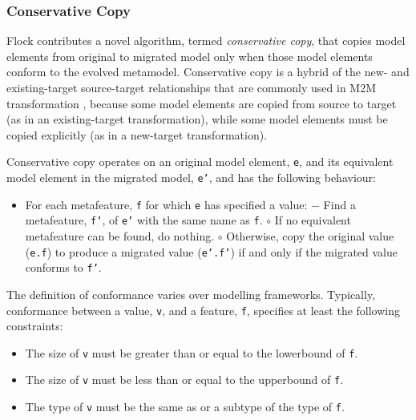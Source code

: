 \subsubsection{Conservative Copy}
\label{subsubsec:conservative_copying}
Flock contributes a novel algorithm, termed \emph{conservative copy}, that copies model elements from original to migrated model only when those model elements conform to the evolved metamodel. Conservative copy is a hybrid of the new- and existing-target source-target relationships that are commonly used in M2M transformation \cite{czarnecki06survey}, because some model elements are copied from source to target (as in an existing-target transformation), while some model elements must be copied explicitly (as in a new-target transformation).

Conservative copy operates on an original model element, \texttt{e}, and its equivalent model element in the migrated model, \texttt{e'}, and has the following behaviour:

\begin{itemize}
	\item For each metafeature, \texttt{f} for which \texttt{e} has specified a value:
		\subitem $-$ Find a metafeature, \texttt{f'}, of \texttt{e'} with the same name as \texttt{f}.
			\subsubitem $\circ$ If no equivalent metafeature can be found, do nothing.
			\subsubitem $\circ$ Otherwise, copy the original value (\texttt{e.f}) to produce a migrated value (\texttt{e'.f'}) if and only if the migrated value conforms to \texttt{f'}.
\end{itemize}

The definition of conformance varies over modelling frameworks. Typically, conformance between a value, \texttt{v}, and a feature, \texttt{f}, specifies at least the following constraints:

\begin{itemize}
	\item The size of \texttt{v} must be greater than or equal to the lowerbound of \texttt{f}.
	\item The size of \texttt{v} must be less than or equal to the upperbound of \texttt{f}.
	\item The type of \texttt{v} must be the same as or a subtype of the type of \texttt{f}.
\end{itemize}

